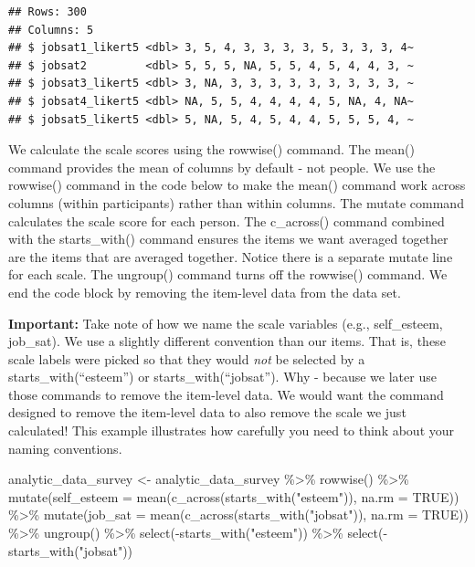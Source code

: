 \documentclass[
]{krantz}
\makeatletter
\newenvironment{Shaded}{\begin{snugshade}}{\end{snugshade}}
\newcommand{\AttributeTok}[1]{\textcolor[rgb]{0.61,0.61,0.61}{#1}}
\newcommand{\ConstantTok}[1]{\textcolor[rgb]{0,0,0}{#1}}
\newcommand{\FunctionTok}[1]{\textcolor[rgb]{0,0,0}{#1}}
\newcommand{\NormalTok}[1]{#1}
\newcommand{\OtherTok}[1]{\textcolor[rgb]{0.37,0.37,0.37}{#1}}
\newcommand{\SpecialCharTok}[1]{\textcolor[rgb]{0,0,0}{#1}}
\newcommand{\StringTok}[1]{\textcolor[rgb]{0.5,0.5,0.5}{#1}}
\newenvironment{kframe}{%
\medskip{}
\setlength{\fboxsep}{.8em}
 \def\at@end@of@kframe{}%
 \ifinner\ifhmode%
  \def\at@end@of@kframe{\end{minipage}}%
  \begin{minipage}{\columnwidth}%
 \fi\fi%
 \def\FrameCommand##1{\hskip\@totalleftmargin \hskip-\fboxsep
 \colorbox{shadecolor}{##1}\hskip-\fboxsep
     \hskip-\linewidth \hskip-\@totalleftmargin \hskip\columnwidth}%
 \MakeFramed {\advance\hsize-\width
   \@totalleftmargin\z@ \linewidth\hsize
   \@setminipage}}%
 {\par\unskip\endMakeFramed%
 \at@end@of@kframe}
\renewenvironment{Shaded}{\begin{kframe}}{\end{kframe}}
\makeatother
\begin{document}
\begin{verbatim}
## Rows: 300
## Columns: 5
## $ jobsat1_likert5 <dbl> 3, 5, 4, 3, 3, 3, 3, 5, 3, 3, 3, 4~
## $ jobsat2         <dbl> 5, 5, 5, NA, 5, 5, 4, 5, 4, 4, 3, ~
## $ jobsat3_likert5 <dbl> 3, NA, 3, 3, 3, 3, 3, 3, 3, 3, 3, ~
## $ jobsat4_likert5 <dbl> NA, 5, 5, 4, 4, 4, 4, 5, NA, 4, NA~
## $ jobsat5_likert5 <dbl> 5, NA, 5, 4, 5, 4, 4, 5, 5, 5, 4, ~
\end{verbatim}

We calculate the scale scores using the rowwise() command. The mean() command provides the mean of columns by default - not people. We use the rowwise() command in the code below to make the mean() command work across columns (within participants) rather than within columns. The mutate command calculates the scale score for each person. The c\_across() command combined with the starts\_with() command ensures the items we want averaged together are the items that are averaged together. Notice there is a separate mutate line for each scale. The ungroup() command turns off the rowwise() command. We end the code block by removing the item-level data from the data set.

\textbf{Important:} Take note of how we name the scale variables (e.g., self\_esteem, job\_sat). We use a slightly different convention than our items. That is, these scale labels were picked so that they would \emph{not} be selected by a starts\_with(``esteem'') or starts\_with(``jobsat''). Why - because we later use those commands to remove the item-level data. We would want the command designed to remove the item-level data to also remove the scale we just calculated! This example illustrates how carefully you need to think about your naming conventions.

\begin{Shaded}
\begin{Highlighting}[]
\NormalTok{analytic\_data\_survey }\OtherTok{\textless{}{-}}\NormalTok{ analytic\_data\_survey }\SpecialCharTok{\%\textgreater{}\%} 
  \FunctionTok{rowwise}\NormalTok{() }\SpecialCharTok{\%\textgreater{}\%} 
  \FunctionTok{mutate}\NormalTok{(}\AttributeTok{self\_esteem =} \FunctionTok{mean}\NormalTok{(}\FunctionTok{c\_across}\NormalTok{(}\FunctionTok{starts\_with}\NormalTok{(}\StringTok{"esteem"}\NormalTok{)),}
                               \AttributeTok{na.rm =} \ConstantTok{TRUE}\NormalTok{)) }\SpecialCharTok{\%\textgreater{}\%}
  \FunctionTok{mutate}\NormalTok{(}\AttributeTok{job\_sat =} \FunctionTok{mean}\NormalTok{(}\FunctionTok{c\_across}\NormalTok{(}\FunctionTok{starts\_with}\NormalTok{(}\StringTok{"jobsat"}\NormalTok{)),}
                               \AttributeTok{na.rm =} \ConstantTok{TRUE}\NormalTok{)) }\SpecialCharTok{\%\textgreater{}\%}
  \FunctionTok{ungroup}\NormalTok{() }\SpecialCharTok{\%\textgreater{}\%}
  \FunctionTok{select}\NormalTok{(}\SpecialCharTok{{-}}\FunctionTok{starts\_with}\NormalTok{(}\StringTok{"esteem"}\NormalTok{)) }\SpecialCharTok{\%\textgreater{}\%}
  \FunctionTok{select}\NormalTok{(}\SpecialCharTok{{-}}\FunctionTok{starts\_with}\NormalTok{(}\StringTok{"jobsat"}\NormalTok{)) }
\end{Highlighting}
\end{Shaded}
\end{document}
